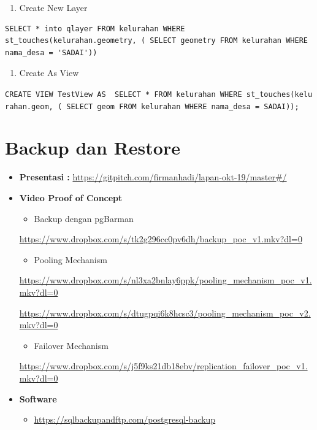 \documentclass[]{book}
\providecommand{\tightlist}{%
  \setlength{\itemsep}{0pt}\setlength{\parskip}{0pt}}
\begin{document}
\begin{enumerate}
\def\labelenumi{\arabic{enumi}.}
\tightlist
\item
  Create New Layer
\end{enumerate}

\begin{verbatim}
SELECT * into qlayer FROM kelurahan WHERE st_touches(kelurahan.geometry, ( SELECT geometry FROM kelurahan WHERE nama_desa = 'SADAI'))
\end{verbatim}

\begin{enumerate}
\def\labelenumi{\arabic{enumi}.}
\setcounter{enumi}{1}
\tightlist
\item
  Create As View
\end{enumerate}

\texttt{CREATE\ VIEW\ TestView\ AS\ \ SELECT\ *\ FROM\ kelurahan\ WHERE\ st\_touches(kelurahan.geom,\ (\ SELECT\ geom\ FROM\ kelurahan\ WHERE\ nama\_desa\ =\ \textquotesingle{}SADAI\textquotesingle{}));}

\hypertarget{backup-dan-restore}{%
\section{Backup dan Restore}\label{backup-dan-restore}}

\begin{itemize}
\item
  \textbf{Presentasi :}
  \href{https://gitpitch.com/firmanhadi/lapan-okt-19/master/}{https://gitpitch.com/firmanhadi/lapan-okt-19/master\#/}
\item
  \textbf{Video Proof of Concept}

  \begin{itemize}
  \tightlist
  \item
    Backup dengan pgBarman
  \end{itemize}

  \url{https://www.dropbox.com/s/tk2g296cc0pv6dh/backup_poc_v1.mkv?dl=0}

  \begin{itemize}
  \tightlist
  \item
    Pooling Mechanism
  \end{itemize}

  \url{https://www.dropbox.com/s/nl3xa2bnlay6ppk/pooling_mechanism_poc_v1.mkv?dl=0}

  \url{https://www.dropbox.com/s/dtugpqi6k8hcsc3/pooling_mechanism_poc_v2.mkv?dl=0}

  \begin{itemize}
  \tightlist
  \item
    Failover Mechanism
  \end{itemize}

  \url{https://www.dropbox.com/s/j5f9ks21db18ebv/replication_failover_poc_v1.mkv?dl=0}
\item
  \textbf{Software}

  \begin{itemize}
  \tightlist
  \item
    \url{https://sqlbackupandftp.com/postgresql-backup}
  \end{itemize}
\end{itemize}
\end{document}
